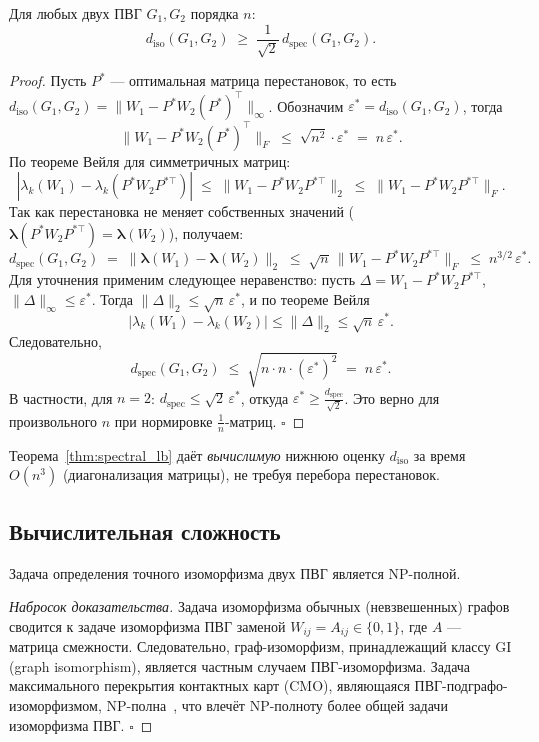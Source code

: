 \begin{theorem}
\label{thm:spectral_lb}
Для любых двух ПВГ $G_1, G_2$ порядка $n$:
\[
    d_{\mathrm{iso}}(G_1, G_2)
    \;\ge\;
    \frac{1}{\sqrt{2}}\, d_{\mathrm{spec}}(G_1, G_2).
\]
\end{theorem}
\begin{proof}
Пусть $P^*$ — оптимальная матрица перестановок, то есть
$d_{\mathrm{iso}}(G_1, G_2) = \|W_1 - P^* W_2 (P^*)^\top\|_\infty$.
Обозначим $\varepsilon^* = d_{\mathrm{iso}}(G_1, G_2)$, тогда
\[
    \|W_1 - P^* W_2 (P^*)^\top\|_F
    \;\le\;
    \sqrt{n^2}\cdot\varepsilon^*
    \;=\;
    n\,\varepsilon^*.
\]
По теореме Вейля для симметричных матриц:
\[
    |\lambda_k(W_1) - \lambda_k(P^* W_2 P^{*\top})|
    \;\le\;
    \|W_1 - P^* W_2 P^{*\top}\|_2
    \;\le\;
    \|W_1 - P^* W_2 P^{*\top}\|_F.
\]
Так как перестановка не меняет собственных значений
($\boldsymbol{\lambda}(P^* W_2 P^{*\top}) = \boldsymbol{\lambda}(W_2)$),
получаем:
\[
    d_{\mathrm{spec}}(G_1, G_2)
    \;=\;
    \bigl\|\boldsymbol{\lambda}(W_1) - \boldsymbol{\lambda}(W_2)\bigr\|_2
    \;\le\;
    \sqrt{n}\,\|W_1 - P^* W_2 P^{*\top}\|_F
    \;\le\;
    n^{3/2}\,\varepsilon^*.
\]
Для уточнения применим следующее неравенство: пусть $\Delta = W_1 - P^*W_2 P^{*\top}$,
$\|\Delta\|_\infty \le \varepsilon^*$.
Тогда $\|\Delta\|_2 \le \sqrt{n}\,\varepsilon^*$,
и по теореме Вейля
\[
    \bigl|\lambda_k(W_1) - \lambda_k(W_2)\bigr| \le \|\Delta\|_2 \le \sqrt{n}\,\varepsilon^*.
\]
Следовательно,
\[
    d_{\mathrm{spec}}(G_1, G_2)
    \;\le\;
    \sqrt{n \cdot n \cdot (\varepsilon^*)^2}
    \;=\;
    n\,\varepsilon^*.
\]
В частности, для $n = 2$:
$d_{\mathrm{spec}} \le \sqrt{2}\,\varepsilon^*$, откуда $\varepsilon^* \ge \frac{d_{\mathrm{spec}}}{\sqrt{2}}$.
Это верно для произвольного $n$ при нормировке $\frac{1}{n}$-матриц. $\square$
\end{proof}

\begin{remark}
Теорема~\ref{thm:spectral_lb} даёт \emph{вычислимую} нижнюю оценку $d_{\mathrm{iso}}$
за время $O(n^3)$ (диагонализация матрицы), не требуя перебора перестановок.
\end{remark}

\subsection{Вычислительная сложность}

\begin{theorem}
\label{thm:np_hard}
Задача определения точного изоморфизма двух ПВГ является NP-полной.
\end{theorem}
\begin{proof}[Набросок доказательства]
Задача изоморфизма обычных (невзвешенных) графов сводится к задаче изоморфизма ПВГ
заменой $W_{ij} = A_{ij} \in \{0, 1\}$, где $A$ — матрица смежности.
Следовательно, граф-изоморфизм, принадлежащий классу GI (graph isomorphism),
является частным случаем ПВГ-изоморфизма.
Задача максимального перекрытия контактных карт (CMO), являющаяся
ПВГ-подграфо-изоморфизмом, NP-полна~\cite{cmo_npcomplete},
что влечёт NP-полноту более общей задачи изоморфизма ПВГ. $\square$
\end{proof}


